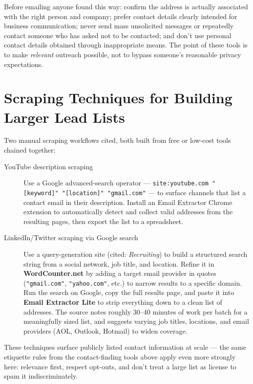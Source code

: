 \begin{caution}
Before emailing anyone found this way: confirm the address is actually associated with the right person and
company; prefer contact details clearly intended for business communication; never send mass unsolicited
messages or repeatedly contact someone who has asked not to be contacted; and don't use personal contact details
obtained through inappropriate means. The point of these tools is to make \emph{relevant} outreach possible, not
to bypass someone's reasonable privacy expectations.
\end{caution}

\section{Scraping Techniques for Building Larger Lead Lists}

Two manual scraping workflows cited, both built from free or low-cost tools chained together:

\begin{description}
  \item[YouTube description scraping] Use a Google advanced-search operator —
  \texttt{site:youtube.com "[keyword]" "[location]" "gmail.com"} — to surface channels that list a contact
  email in their description. Install an Email Extractor Chrome extension to automatically detect and collect
  valid addresses from the resulting pages, then export the list to a spreadsheet.
  \item[LinkedIn/Twitter scraping via Google search] Use a query-generation site (cited: \emph{Recruiting}) to
  build a structured search string from a social network, job title, and location. Refine it in
  \textbf{WordCounter.net} by adding a target email provider in quotes (\texttt{"gmail.com"}, \texttt{"yahoo.com"},
  etc.) to narrow results to a specific domain. Run the search on Google, copy the full results page, and paste
  it into \textbf{Email Extractor Lite} to strip everything down to a clean list of addresses. The source notes
  roughly 30--40 minutes of work per batch for a meaningfully sized list, and suggests varying job titles,
  locations, and email providers (AOL, Outlook, Hotmail) to widen coverage.
\end{description}

\begin{caution}
These techniques surface publicly listed contact information at scale — the same etiquette rules from the
contact-finding tools above apply even more strongly here: relevance first, respect opt-outs, and don't treat a
large list as license to spam it indiscriminately.
\end{caution}

